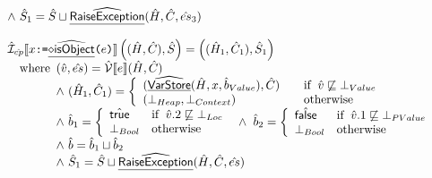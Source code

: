 \[\begin{array}{ll}
{   \land\ \hat{S}_1 = \hat{S}\sqcup\widehat{\underline{\sf RaiseException}}(\hat{H},\hat{C}, \hat{es}_3)
 }
\\
\\
\hat{\mathcal{I}}_{\hat{cp}}\llbracket x \mbox{\texttt{:=}} \widehat{\underline{\sf \diamond isObject}}\mbox{\texttt{(}}e\mbox{\texttt{)}} \rrbracket \left((\hat{H},\hat{C}),\hat{S}\right)
 = \left((\hat{H}_1,\hat{C}_1),\hat{S}_1\right)\\
 \quad{\rm where}\begin{array}[t]{l}
   (\hat{v},\hat{es})=\hat{\mathcal{V}}\llbracket e\rrbracket(\hat{H},\hat{C})\\
   \land\ (\hat{H}_1, \hat{C}_1) = \left\{
     \begin{array}{ll}
       (\widehat{\underline{\sf VarStore}}(\hat{H},x,\hat{b}_{Value}), \hat{C})
       & \quad{\rm if}\begin{array}[t]{l}\hat{v}\not\sqsubseteq\bot_{Value}\end{array} \\
       (\bot_{Heap}, \bot_{Context}) & \quad{\rm otherwise}
     \end{array}
   \right.\\
   \land\ \hat{b}_1 = \left\{
     \begin{array}{ll}
       \hat{\mbox{\textsf{true}}} & {\rm if}\begin{array}[t]{l}\hat{v}.2 \not\sqsubseteq \bot_{Loc}\end{array} \\
       \bot_{Bool} & {\rm otherwise} \\
     \end{array}
   \right. 
   \land\ \hat{b}_2 = \left\{
     \begin{array}{ll}
       \hat{\mbox{\textsf{false}}} & {\rm if}\begin{array}[t]{l}\hat{v}.1 \not\sqsubseteq \bot_{PValue}\end{array} \\
       \bot_{Bool} & {\rm otherwise} \\
     \end{array}
   \right. \\
   \land\ \hat{b} = \hat{b}_1 \sqcup \hat{b}_2 \\
   \land\ \hat{S}_1 = \hat{S}\sqcup\widehat{\underline{\sf RaiseException}}(\hat{H},\hat{C}, \hat{es})
 \end{array}
\\
\\

\end{array}
\]
